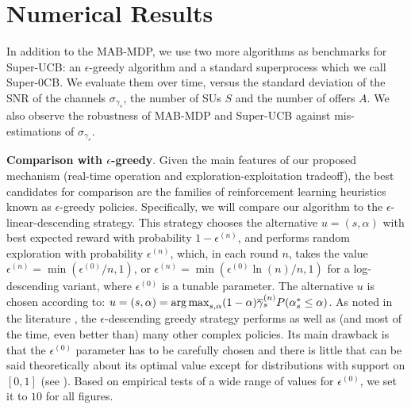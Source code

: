 \section{Numerical Results}\label{sec:Num}
In addition to the MAB-MDP, we use two more algorithms as benchmarks for Super-UCB: an $\epsilon$-greedy algorithm and a standard superprocess which we call Super-0CB. We evaluate them over time, versus the standard deviation of the SNR of the channels $\sigma_{\gamma_s}$, the number of SUs $S$ and the number of offers $A$. We also observe the robustness of MAB-MDP and Super-UCB against mis-estimations of $\sigma_{\gamma_s}$.

\textbf{Comparison with $\epsilon$-greedy}.
Given the main features of our proposed mechanism (real-time operation and exploration-exploitation tradeoff), the best candidates for comparison are the families of reinforcement learning heuristics \cite{ref:Vermorel2005,ref:Sutton1998} known as $\epsilon$-greedy policies.
Specifically, we will compare our algorithm to the $\epsilon$-linear-descending strategy. 
This strategy chooses the alternative $u = (s,\alpha)$ with best expected reward with probability $1-\epsilon^{(n)}$, and performs random exploration with probability $\epsilon^{(n)}$, which, in each round $n$, takes the value $\epsilon^{(n)} = \min\left(\epsilon^{(0)}/n,1\right)$, or $\epsilon^{(n)} = \min\left(\epsilon^{(0)}\ln(n)/n,1\right)$ for a log-descending variant, where $\epsilon^{(0)}$ is a tunable parameter. The alternative $u$ is chosen according to: $u = (s,\alpha) = \operatorname*{arg\,max}_{s,\alpha} (1-\alpha)\overline{\gamma}^{(n)}_s P(\alpha_s^* \leq \alpha)$.
As noted in the literature \cite{ref:Auer2002,ref:Vermorel2005}, the $\epsilon$-descending greedy strategy performs as well as (and most of the time, even better than) many other complex policies. 
Its main drawback is that the $\epsilon^{(0)}$ parameter has to be carefully chosen and there is little that can be said theoretically about its optimal value except for distributions with support on $[0,1]$ (see \cite{ref:Auer2002}). 
Based on empirical tests of a wide range of values for $\epsilon^{(0)}$, we set it to $10$ for all figures. 

